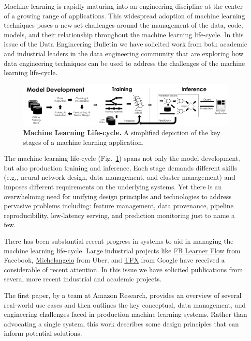 \documentclass[11pt]{article}
\begin{document}
Machine learning is rapidly maturing into an engineering discipline at the center of a growing range of applications.
This widespread adoption of machine learning techniques poses a new set challenges around the management of the data, code, models, and their relationship throughout the machine learning life-cycle.
In this issue of the Data Engineering Bulletin we have solicited work from both academic and industrial leaders in the data engineering community that are exploring how data engineering techniques can be used to address the challenges of the machine learning life-cycle.




\begin{figure}[h]
\centering
\includegraphics[width=\textwidth]{pipeline}
\caption{\small \textbf{Machine Learning Life-cycle.} A simplified depiction of the key stages of a machine learning application.}
\label{fig:mllc}
\end{figure}


The machine learning life-cycle (Fig.~\ref{fig:mllc}) spans not only the model development, but also production training and inference.
Each stage demands different skills (e.g., neural network design, data management, and cluster management) and imposes different requirements on the underlying systems.
Yet there is an overwhelming need for unifying design principles and technologies to address pervasive problems including: feature management, data provenance, pipeline reproducibility, low-latency serving, and prediction monitoring just to name a few.


There has been substantial recent progress in systems to aid in managing the machine learning life-cycle.  
Large industrial projects like \href{https://code.fb.com/core-data/introducing-fblearner-flow-facebook-s-ai-backbone/}{FB Learner Flow} from Facebook, \href{https://eng.uber.com/michelangelo/}{Michelangelo} from Uber, and \href{https://www.tensorflow.org/tfx/}{TFX} from Google have received a considerable of recent attention.  
In this issue we have solicited publications from several more recent industrial and academic projects.

The first paper, by a team at Amazon Research, provides an overview of several real-world use cases and then outlines the key conceptual, data management, and engineering challenges faced in production machine learning systems.
Rather than advocating a single system, this work describes some design principles that can inform potential solutions.
\end{document}
